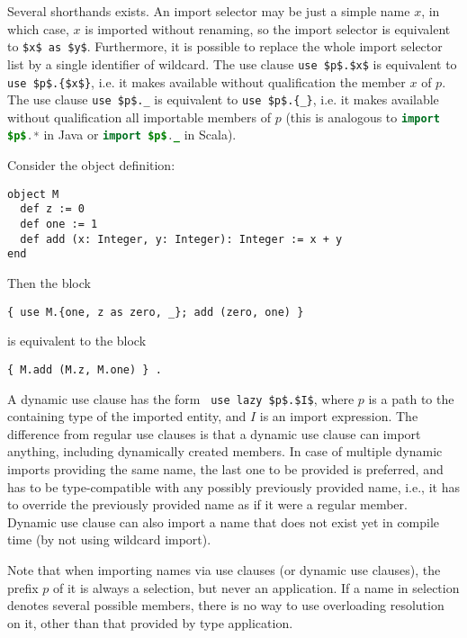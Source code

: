 Several shorthands exists. An import selector may be just a simple name $x$, in which case, $x$ is imported without renaming, so the import selector is equivalent to \lstinline!$x$ as $y$!. Furthermore, it is possible to replace the whole import selector list by a single identifier of wildcard. The use clause \lstinline!use $p$.$x$! is equivalent to \lstinline!use $p$.{$x$}!, i.e. it makes available without qualification the member $x$ of $p$. The use clause \lstinline!use $p$._! is equivalent to \lstinline!use $p$.{_}!, i.e. it makes available without qualification all importable members of $p$ (this is analogous to \lstinline[language=Java]!import $p$.*! in Java or \lstinline[language=Java]!import $p$._! in Scala). 

\example Consider the object definition:
\begin{lstlisting}
object M
  def z := 0
  def one := 1
  def add (x: Integer, y: Integer): Integer := x + y
end
\end{lstlisting}
Then the block
\begin{lstlisting}
{ use M.{one, z as zero, _}; add (zero, one) }
\end{lstlisting}
is equivalent to the block
\begin{lstlisting}
{ M.add (M.z, M.one) } .
\end{lstlisting}

A dynamic use clause has the form ~\lstinline!use lazy $p$.$I$!, where $p$ is a path to the containing type of the imported entity, and $I$ is an import expression. The difference from regular use clauses is that a dynamic use clause can import anything, including dynamically created members. In case of multiple dynamic imports providing the same name, the last one to be provided is preferred, and has to be type-compatible with any possibly previously provided name, i.e., it has to override the previously provided name as if it were a regular member. Dynamic use clause can also import a name that does not exist yet in compile time (by not using wildcard import). 

Note that when importing names via use clauses (or dynamic use clauses), the prefix $p$ of it is always a selection, but never an application. If a name in selection denotes several possible members, there is no way to use overloading resolution on it, other than that provided by type application. 



